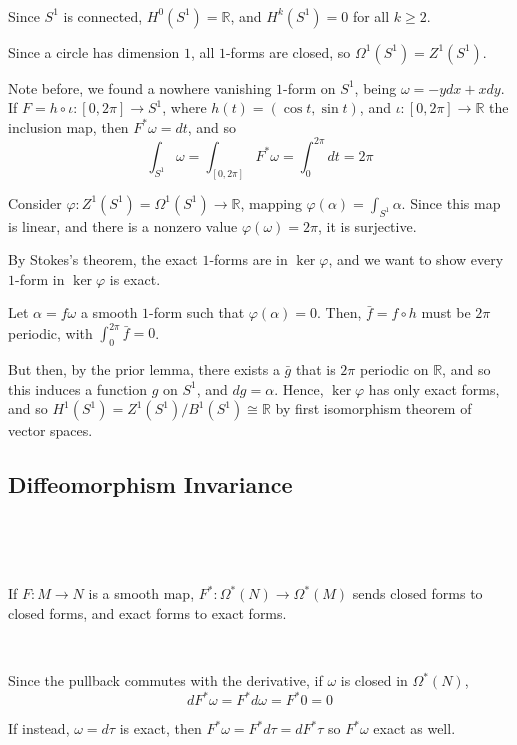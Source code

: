 \documentclass{article}
\begin{document}
\begin{example}[$S^1$]
  \

  Since $S^1$ is connected, $H^0(S^1) = \mathbb{R}$, and $H^k(S^1) = 0$ for all $k \geq 2$.

  Since a circle has dimension $1$, all $1$-forms are closed, so $\Omega^1(S^1) = Z^1(S^1)$.

  Note before, we found a nowhere vanishing $1$-form on $S^1$, being $\omega = -ydx + x dy$. If $F = h \circ \iota: [0, 2\pi] \to S^1$, where $h(t) = (\cos t, \sin t)$, and $\iota: [0,2\pi] \to \mathbb{R}$ the inclusion map, then $F^* \omega = dt$, and so $$\int_{S^1} \omega = \int_{[0,2\pi]} F^*\omega = \int_0^{2\pi} dt = 2\pi$$

  Consider $\varphi: Z^1(S^1) = \Omega^1(S^1) \to \mathbb{R}$, mapping $\varphi(\alpha) = \int_{S^1} \alpha$. Since this map is linear, and there is a nonzero value $\varphi(\omega) = 2\pi$, it is surjective.

  By Stokes's theorem, the exact $1$-forms are in $\ker \varphi$, and we want to show every $1$-form in $\ker\varphi $ is exact.

  Let $\alpha = f\omega$ a smooth $1$-form such that $\varphi(\alpha) = 0$. Then, $\bar{f} = f \circ h$ must be $2\pi$ periodic, with $\int_0^{2\pi} \bar{f} = 0$.

  But then, by the prior lemma, there exists a $\bar{g}$ that is $2\pi$ periodic on $\mathbb{R}$, and so this induces a function $g$ on $S^1$, and $dg = \alpha$. Hence, $\ker\varphi$ has only exact forms, and so $H^1(S^1) = Z^1(S^1)/B^1(S^1) \cong \mathbb{R}$ by first isomorphism theorem of vector spaces.
\end{example}

\subsection{Diffeomorphism Invariance}
\

\begin{lemma}
  \

  If $F: M \to N$ is a smooth map, $F^*: \Omega^*(N) \to \Omega^*(M)$ sends closed forms to closed forms, and exact forms to exact forms.
\end{lemma}

\begin{customproof}
  \

  Since the pullback commutes with the derivative, if $\omega$ is closed in $\Omega^*(N)$, $$dF^* \omega = F^* d\omega = F^* 0 = 0$$

  If instead, $\omega = d\tau$ is exact, then $F^* \omega = F^*d\tau = dF^*\tau$ so $F^*\omega$ exact as well.
\end{customproof}
\end{document}
